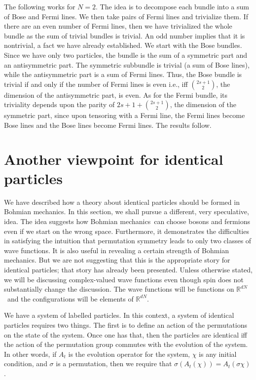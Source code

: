 \documentclass[11pt]{article}
\theoremstyle{remark}
\begin{document}
The following works for $N=2$. 
The idea is to decompose each bundle into a sum of Bose
and Fermi lines. 
We then take pairs of  Fermi lines and trivialize them. 
If there are an even number of Fermi lines, then we have
trivialized the whole bundle as the sum of trivial bundles is
trivial. 
 An odd number implies that it is
nontrivial, a fact we have already established. 
We start with the Bose bundles.
Since we have only two particles,
the bundle is the sum of a symmetric part and an antisymmetric
part. The symmetric subbundle is trivial (a sum of Bose lines), 
while the antisymmetric part
is a sum of Fermi lines. Thus, the Bose bundle is trivial if and only
if the number of Fermi lines is even i.e., iff  $\binom{2s+1}{2}$, the
dimension of the  
antisymmetric part, is even. 
As for the
Fermi bundle, its triviality depends upon the parity of $2s+1 +
\binom{2s+1}{2}$, the dimension of the
symmetric part, since upon tensoring with a Fermi line, the Fermi lines
become Bose lines and the Bose lines become Fermi lines. 
The results follow.


\section{Another viewpoint for identical particles} \label{s:view}


We have described 
how a theory about identical particles should be formed in Bohmian mechanics. In
this section, we shall pursue a different, very speculative, idea. The
idea suggests
how Bohmian mechanics\ can choose bosons and fermions even if we start on the
wrong space. Furthermore, it demonstrates 
the difficulties 
in 
 satisfying the intuition that permutation symmetry leads to
only two classes of wave functions. It is also useful in revealing a certain
strength of Bohmian mechanics. But we are not suggesting that this is the
appropriate story for identical particles; that story has already been
presented. 
Unless otherwise stated, we will be discussing complex-valued
wave functions even though spin does not substantially change the discussion. 
The wave functions will be functions on \ensuremath{\mathbb{R}^{\ensuremath{d} N}}\ and the configurations will
be elements of \ensuremath{\mathbb{R}^{\ensuremath{d} N}}. 

We have a system of labelled particles. 
In this context,  a system of identical particles 
requires two things. The first is to define an action of the
permutations on the state of the system. Once one has that, then the
particles are identical iff the action of the permutation group
commutes with the evolution of the system. In other words, if $A_t$ is
the evolution operator for the 
system, $\chi$
is any initial condition, and $\sigma$ is a permutation,
then we require that $\sigma(A_t(\chi)) = A_t(\sigma\chi)$. 
\end{document}
